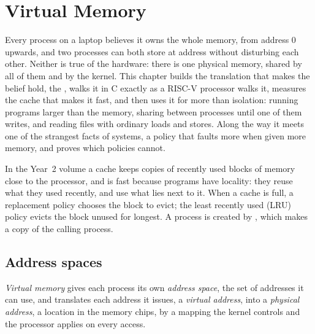 \chapter{Virtual Memory}\label{ch:b3:virtual-memory}

Every process on a laptop believes it owns the whole memory, from address 0 upwards, and two processes can both store at address  without disturbing each other. Neither is true of the hardware: there is one physical memory, shared by all of them and by the kernel. This chapter builds the translation that makes the belief hold, the , walks it in C exactly as a RISC-V processor walks it, measures the cache that makes it fast, and then uses it for more than isolation: running programs larger than the memory, sharing  between processes until one of them writes, and reading files with ordinary loads and stores. Along the way it meets one of the strangest facts of systems, a policy that faults more when given more memory, and proves which policies cannot.

\begin{recall}
In the Year~2 volume a cache keeps copies of recently used blocks of memory close to the processor, and is fast because programs have locality: they reuse what they used recently, and use what lies next to it. When a cache is full, a replacement policy chooses the block to evict; the least recently used (LRU) policy evicts the block unused for longest. A process is created by , which makes a copy of the calling process.
\end{recall}

\section{Address spaces}\label{sec:b3:virtual-memory:spaces}

\begin{definition}\label{def:b3:virtual-memory:space}
\emph{Virtual memory} gives each process its own \emph{address space}, the set of addresses it can use, and translates each address it issues, a \emph{virtual address}, into a \emph{physical address}, a location in the memory chips, by a mapping the kernel controls and the processor applies on every access.
\end{definition}

